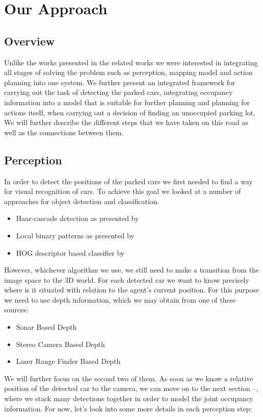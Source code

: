 \chapter{Our Approach}
\label{cha:our_approach}

\section{Overview} %
\label{sec:overview}
Unlike the works presented in the related works we were interested in integrating all stages of solving the problem such as perception, mapping model and action planning into one system. We further present an integrated framework for carrying out the task of detecting the parked cars, integrating occupancy information into a model that is suitable for further planning and planning for actions itself, when carrying out a decision of finding an unoccupied parking lot.
We will further describe the different steps that we have taken on this road as well as the connections between them.

\section{Perception} %
\label{sec:perception}
    In order to detect the positions of the parked cars we first needed to find a way for visual recognition of cars. To achieve this goal we looked at a number of approaches for object detection and classification.
    \begin{itemize}
        \item Haar-cascade detection as presented by~\cite{violajones2001}
        \item Local binary patterns as presented by~\cite{lbp2010}
        \item HOG descriptor based classifier by~\cite{dalal2005}
    \end{itemize}
    However, whichever algorithm we use, we still need to make a transition from the image space to the 3D world. For each detected car we want to know precisely where is it situated with relation to the agent's current position.
    For this purpose we need to use depth information, which we may obtain from one of these sources:
    \begin{itemize}
        \item Sonar Based Depth
        \item Stereo Camera Based Depth
        \item Laser Range Finder Based Depth
    \end{itemize}
    We will further focus on the second two of them.
    As soon as we know a relative position of the detected car to the camera, we can move on to the next section --, where we stack many detections together in order to model the joint occupancy information.
    For now, let's look into some more details in each perception step:
